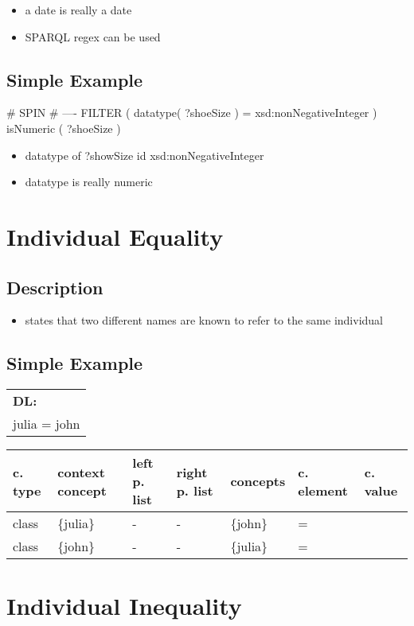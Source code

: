\documentclass{llncs}
\newenvironment{gcotable}{
  \scriptsize
  \sffamily
  \vspace{0.3cm}
  \begin{tabular}{l|l|l|l|l|l|l}
  \hline
  \textbf{c. type} & \textbf{context concept} & \textbf{left p. list} & \textbf{right p. list} & \textbf{concepts} & \textbf{c. element} & \textbf{c. value} \\
  \hline

}{
  \hline
  \end{tabular}
  \linebreak
}
\newenvironment{DL}{
  \scriptsize
  \sffamily
  \vspace{0.3cm}
  \begin{tabular}{l}
	\textbf{DL:} \\

}{
  \end{tabular}
  \linebreak
}
\begin{document}
\begin{itemize}
	\item a date is really a date
  \item SPARQL regex can be used
\end{itemize}

\subsection{Simple Example}

\begin{ex}
# SPIN
# ----
FILTER ( datatype( ?shoeSize ) = xsd:nonNegativeInteger )
isNumeric ( ?shoeSize )
\end{ex}

\begin{itemize}
	\item datatype of ?showSize id xsd:nonNegativeInteger
	\item datatype is really numeric
\end{itemize}

\section{Individual Equality}

\subsection{Description}

\begin{itemize}
	\item states that two different names are known to refer to the same individual \cite{Kroetzsch2012}
\end{itemize}

\subsection{Simple Example}

\begin{DL}
julia = john \\
\end{DL}

\begin{gcotable}
class & \{julia\} & - & - & \{john\} & = \\
class & \{john\} & - & - & \{julia\} & = \\
\end{gcotable}

\section{Individual Inequality}
\end{document}
